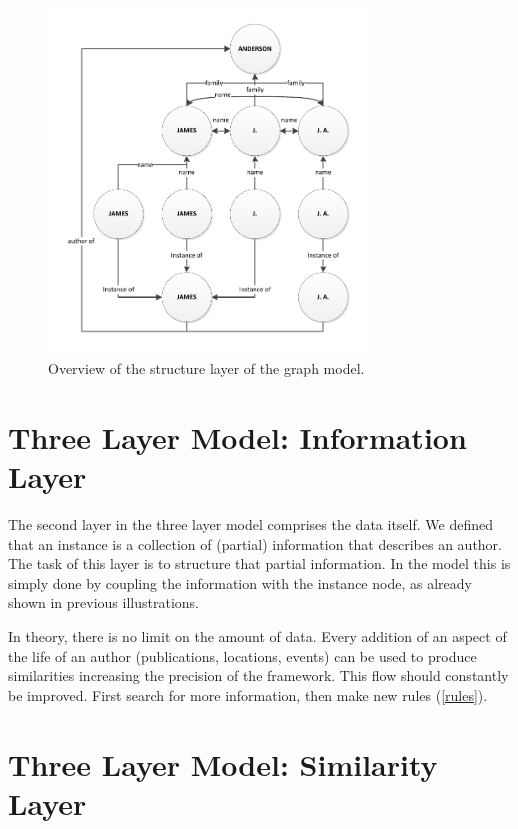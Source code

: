 \begin{figure}[htb]
	\centering
		\includegraphics[width=0.75\textwidth]{fig/graphstructureoverview}
	\caption{Overview of the structure layer of the graph model.}
	\label{fig:graphstructureoverview}
\end{figure}

\section{Three Layer Model: Information Layer}

The second layer in the three layer model comprises the data itself. We defined that an instance is a collection of (partial) information that describes an author. The task of this layer is to structure that partial information. In the model this is simply done by coupling the information with the instance node, as already shown in previous illustrations.

In theory, there is no limit on the amount of data. Every addition of an aspect of the life of an author (publications, locations, events) can be used to produce similarities increasing the precision of the framework. This flow should constantly be improved. First search for more information, then make new rules (\autoref{rules}).

\section{Three Layer Model: Similarity Layer}

